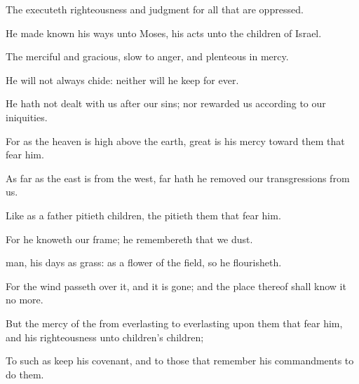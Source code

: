{\Q {}The
{}
executeth
righteousness and
judgment for all that are
oppressed.


\par }{\Q {}He made
known his
ways unto
Moses, his
acts unto the
children of
Israel.


\par }{\Q {}The
{}
{}
merciful and
gracious,
slow to
anger, and
plenteous in
mercy.


\par }{\Q {}He will not
always
chide: neither will he
keep
{} for
ever.


\par }{\Q {}He hath not
dealt with us after our
sins; nor
rewarded us according to our
iniquities.


\par }{\Q {}For as the
heaven is high
above the
earth,
{}
great is his
mercy toward them that
fear him.


\par }{\Q {}As far
as the
east is from the
west,
{} far hath he
removed our
transgressions from us.


\par }{\Q {}Like as a
father
pitieth
{}
children,
{} the
{}
pitieth them that
fear him.


\par }{\Q {}For he
knoweth our
frame; he
remembereth that we
{}
dust.


\par }{\Q {}
man, his
days
{} as
grass: as a
flower of the
field, so he
flourisheth.


\par }{\Q {}For the
wind passeth
over it, and it is gone; and the
place thereof shall
know it no more.


\par }{\Q {}But the
mercy of the
{}
{} from
everlasting
to
everlasting upon them that
fear him, and his
righteousness unto
children’s
children;


\par }{\Q {}To such as
keep his
covenant, and to those that
remember his
commandments to
do them.


\par }{\BB \par }
